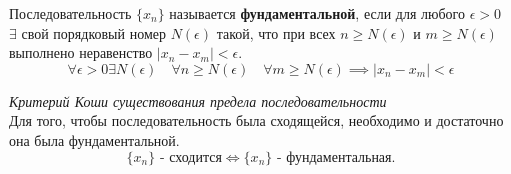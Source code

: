 \begin{definition}
  Последовательность $\{x_{n}\} $ называется \textbf{фундаментальной}, если для любого $\epsilon > 0$ $\exists $ свой порядковый номер $N(\epsilon)$ такой, что при всех $n \ge N(\epsilon)$ и $m \ge  N(\epsilon)$ выполнено неравенство $|x_{n} - x_{m}| < \epsilon$.
  \[
    \forall \epsilon > 0 \exists N(\epsilon) 
    \quad \forall n \ge N(\epsilon)
    \quad \forall m \ge N(\epsilon) 
    \implies |x_{n} - x_{m}| < \epsilon
  \]
\end{definition}

\begin{theorem}
  \textit{Критерий Коши существования предела последовательности} \\
  Для того, чтобы последовательность была сходящейся, необходимо и достаточно она была фундаментальной.
  \[
    \{x_{n}\} \text{ - сходится} \iff \{x_{n}\} \text{ - фундаментальная}
  .\] 
\end{theorem}

